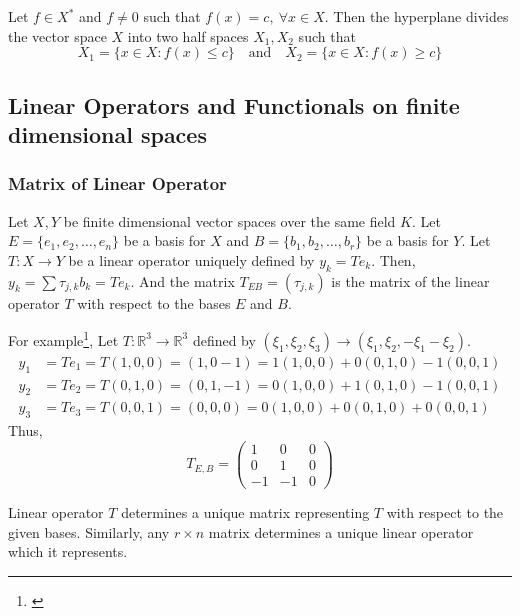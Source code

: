 \begin{definition}
	Let $f \in X^\ast$ and $f \ne 0$ such that $f(x) = c,\ \forall x \in X$.
	Then the hyperplane divides the vector space $X$ into two half spaces $X_1,X_2$ such that
	\[ X_1 = \{ x \in X : f(x) \le c \} \quad \text{and} \quad X_2 = \{ x \in X : f(x) \ge c \} \]
\end{definition}


\subsection{Linear Operators and Functionals on finite dimensional spaces}
\subsubsection{Matrix of Linear Operator}
Let $X,Y$ be finite dimensional vector spaces over the same field $K$.
Let $E = \{e_1,e_2,\dots,e_n\}$ be a basis for $X$ and $B = \{b_1,b_2,\dots,b_r\}$ be a basis for $Y$.
Let $T : X \to Y$ be a linear operator uniquely defined by $y_k = Te_k$.
Then, $y_k = \sum \tau_{j,k}b_k = Te_k$.
And the matrix $T_{EB} = (\tau_{j,k})$ is the matrix of the linear operator $T$ with respect to the bases $E$ and $B$.\\

\begin{commentary}
	For example\footnote{\cite[\S2.10 Exercise 2]{kreyszig}},
	Let $T :\mathbb{R}^3 \to \mathbb{R}^3$ defined by $(\xi_1,\xi_2,\xi_3) \to (\xi_1,\xi_2,-\xi_1-\xi_2)$.
	\begin{align*}
		y_1 &= Te_1 = T(1,0,0) = (1,0-1) = 1(1,0,0)+0(0,1,0)-1(0,0,1) \\
		y_2 &= Te_2 = T(0,1,0) = (0,1,-1) = 0(1,0,0)+1(0,1,0)-1(0,0,1) \\
		y_3 &= Te_3 = T(0,0,1) = (0,0,0) = 0(1,0,0)+0(0,1,0)+0(0,0,1)
	\end{align*}
	Thus,
	\[ T_{E,B} = \begin{pmatrix} 1 & 0 & 0\\ 0 & 1 & 0 \\ -1 & -1 & 0 \end{pmatrix} \]
\end{commentary}

\begin{important}
	Linear operator $T$ determines a unique matrix representing $T$ with respect to the given bases.
	Similarly, any $r \times n$ matrix determines a unique linear operator which it represents.
\end{important}

